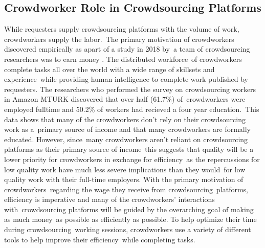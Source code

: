 \documentclass[letterpaper,12pt]{article}
\begin{document}
\subsection{Crowdworker Role in Crowdsourcing Platforms}
While requesters supply crowdsourcing platforms with the volume of work, crowdworkers supply the labor.\
The primary motivation of crowdworkers discovered empirically as apart of a study in 2018 by\
a team of crowdsourcing researchers was to earn money \cite{Kaplan2018}. The distributed workforce\
of crowdworkers complete tasks all over the world with a wide range of skillsets and experience\
while providing human intelligence to complete work published by requesters. The researchers
who performed the survey on crowdsourcing workers in Amazon MTURK discovered that over half (61.7\%) of\
crowdworkers were employed fulltime and 50.2\% of workers had recieved a four year education.\cite{Kaplan2018}\
This data shows that many of the crowdworkers don't rely on their crowdsourcing work as a\
primary source of income and that many crowdworkers are formally educated. However, since\
many crowdworkers aren't reliant on crowdsourcing platforms as their primary source of income\
this suggests that quality will be a lower priority for crowdworkers in exchange for efficiency\
as the repercussions for low quality work have much less severe implications than they would\
for low quality work with their full-time employers. With the primary motivation of crowdworkers\
regarding the wage they receive from crowdsourcing\
platforms, efficiency is imperative and many of the crowdworkers' interactions with\
crowdsourcing platforms will be guided by the overarching goal of making as much money\
as possible as efficiently as possible. To help optimize their time during crowdsourcing\
working sessions, crowdworkers use a variety of different tools to help improve their efficiency\
while completing tasks.

\end{document}
